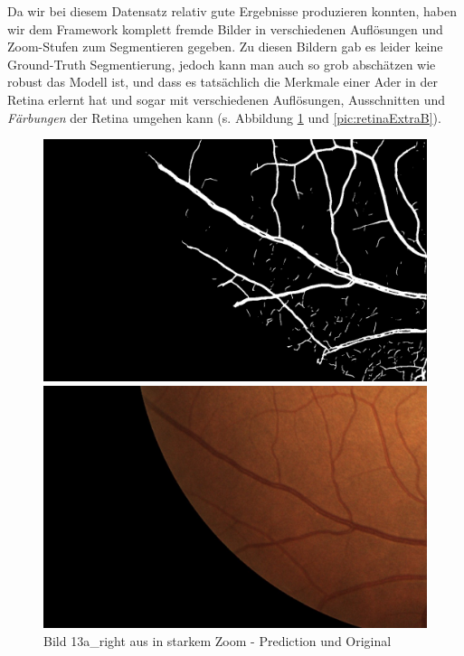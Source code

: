 Da wir bei diesem Datensatz relativ gute Ergebnisse produzieren konnten, haben wir dem Framework komplett fremde Bilder \cite{retina2dExtra} in verschiedenen Auflösungen und Zoom-Stufen zum Segmentieren gegeben. Zu diesen Bildern gab es leider keine Ground-Truth Segmentierung, jedoch kann man auch so grob abschätzen wie robust das Modell ist, und dass es tatsächlich die Merkmale einer Ader in der Retina erlernt hat und sogar mit verschiedenen Auflösungen, Ausschnitten und \textit{Färbungen} der Retina umgehen kann (s. Abbildung \ref{pic:retinaExtraA} und \ref{pic:retinaExtraB}).
\begin{figure}[H]

\begin{minipage}{.5\textwidth}
\includegraphics[width=\textwidth]{Pictures/nnUnet/Praxis/Task205-Augen-minimal-13-trainsamples/extra_Bilder/13a_right_cut.png}
\end{minipage}
\begin{minipage}{.5\textwidth}
\includegraphics[width=\textwidth]{Pictures/nnUnet/Praxis/Task205-Augen-minimal-13-trainsamples/extra_Bilder/13a_right_cut-original.jpeg}
\end{minipage}
\caption{Bild 13a\_right aus \cite{retina2dExtra} in starkem Zoom - Prediction und Original}
\label{pic:retinaExtraA}
\end{figure}

